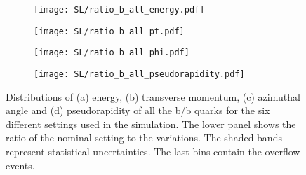 \begin{figure}[H]
    \centering
    \begin{subfigure}{0.49\textwidth}
        \centering
        \texttt{[image: SL/ratio\_b\_all\_energy.pdf]}
        \caption{}
        \label{app:subfig:Ε(b_all)_SL}
    \end{subfigure}
    \begin{subfigure}{0.49\textwidth}
        \centering
        \texttt{[image: SL/ratio\_b\_all\_pt.pdf]}
        \caption{}
        \label{app:subfig:pt(b_all)_SL}
    \end{subfigure}

    \vspace{0.2cm}
    
    \begin{subfigure}{0.49\textwidth}
        \centering
        \texttt{[image: SL/ratio\_b\_all\_phi.pdf]}
        \caption{}
        \label{app:subfig:phi(b_all)_SL}
    \end{subfigure}
    \begin{subfigure}{0.49\textwidth}
        \centering
        \texttt{[image: SL/ratio\_b\_all\_pseudorapidity.pdf]}
        \caption{}
        \label{app:subfig:eta(b_all)_SL}
    \end{subfigure}
    \caption{Distributions of (a) energy, (b) transverse momentum,  (c) azimuthal angle and (d) pseudorapidity of all the b/$\overline{\text{b}}$ quarks for the six different settings used in the simulation. The lower panel shows the ratio of the nominal setting to the variations. The shaded bands represent statistical uncertainties. The last bins contain the overflow events.}
    \label{app:fig:b_all_SL}
\end{figure}



